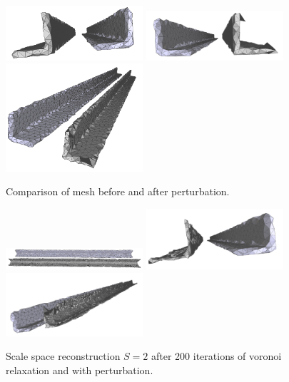 \documentclass[12pt]{drexelthesis}
\begin{document}
\begin{figure}[!ht]
	\centering
		\includegraphics[width=2in]{simulated-lab-scan/0noise/optimized/advancedfrontperturbvslloyd00.png}
		\includegraphics[width=2in]{simulated-lab-scan/0noise/optimized/advancedfrontperturbvslloyd01.png}
		\includegraphics[width=2in]{simulated-lab-scan/0noise/optimized/advancedfrontperturbvslloyd02.png}
		\caption[Comparison of mesh before and after perturbation]{\centering  Comparison of mesh before and after perturbation.}
	\label{zeronoise:advancedlloydperturb}
\end{figure}


\begin{figure}[!ht]
	\centering
		\includegraphics[width=2in]{simulated-lab-scan/0noise/optimized/scalespace2lloydvsperturb00.png}
		\includegraphics[width=2in]{simulated-lab-scan/0noise/optimized/scalespace2lloydvsperturb01.png}
		\includegraphics[width=2in]{simulated-lab-scan/0noise/optimized/scalespace2lloydvsperturb02.png}
		\caption[Scale space reconstruction $S = 2$ after 200 iterations of voronoi relaxation and with perturbation]{\centering Scale space reconstruction $S = 2$ after 200 iterations of voronoi relaxation and with perturbation.}
	\label{zeronoise:scalespace2lloydperturb}
\end{figure}
\end{document}
